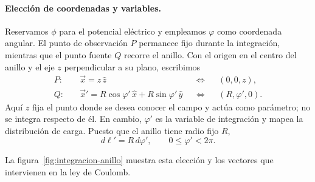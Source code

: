 \documentclass[11pt]{article}
\begin{document}
\paragraph{Elección de coordenadas y variables.}
Reservamos $\phi$ para el potencial eléctrico y empleamos $\varphi$ como
coordenada angular. El punto de observación $P$ permanece fijo durante la
integración, mientras que el punto fuente $Q$ recorre el anillo. Con el origen en
el centro del anillo y el eje $z$ perpendicular a su plano, escribimos
\begin{equation}
\begin{aligned}
P:&\quad \vec x=z\,\hat z
&&\Longleftrightarrow&&(0,0,z),\\
Q:&\quad \vec x'=R\cos\varphi'\,\hat x
             +R\sin\varphi'\,\hat y
&&\Longleftrightarrow&&(R,\varphi',0).
\end{aligned}
\label{eq:puntos}
\end{equation}
Aquí $z$ fija el punto donde se desea conocer el campo y actúa como parámetro; no
se integra respecto de él. En cambio, $\varphi'$ es la variable de integración y
mapea la distribución de carga. Puesto que el anillo tiene radio fijo $R$,
\[
d\ell'=R\,d\varphi',
\qquad 0\leq\varphi'<2\pi.
\]

La figura~\ref{fig:integracion-anillo} muestra esta elección y los vectores que
intervienen en la ley de Coulomb.
\end{document}
